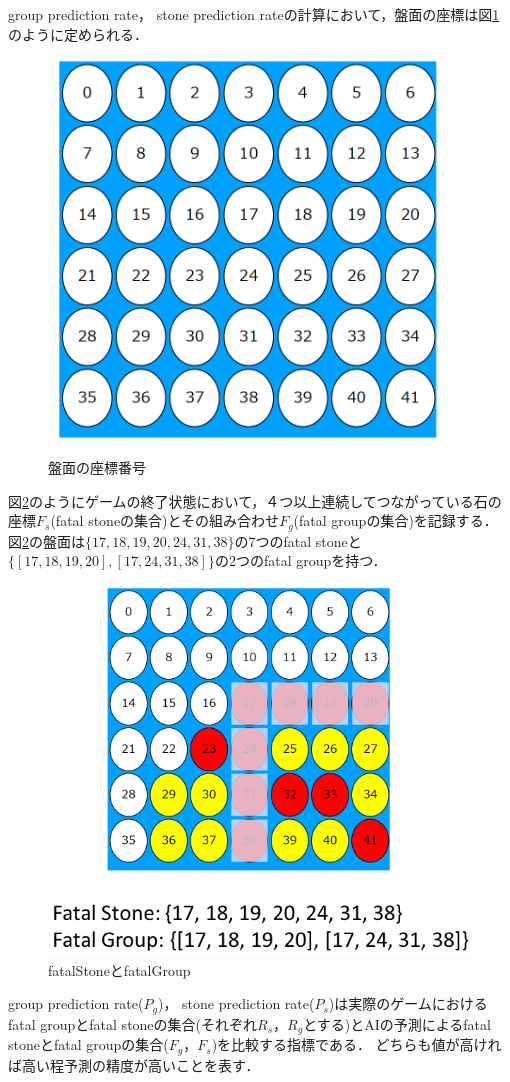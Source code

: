 group prediction rate， stone prediction rateの計算において，盤面の座標は図\ref{fig:index}のように定められる．
\begin{figure}[htbp]
	\centering
	\includegraphics[width=300pt]{./figure/index.png}
	\caption{盤面の座標番号}
	\label{fig:index}
\end{figure}
図\ref{fig:fatalGroup}のようにゲームの終了状態において，４つ以上連続してつながっている石の座標$F_s$(fatal stoneの集合)とその組み合わせ$F_g$(fatal groupの集合)を記録する．
図\ref{fig:fatalGroup}の盤面は$\{17, 18, 19, 20, 24, 31, 38\}$の7つのfatal stoneと$\{[17, 18, 19, 20], [17, 24, 31, 38]\}$の2つのfatal groupを持つ．
\begin{figure}[htbp]
	\centering
	\includegraphics[width=\linewidth]{./figure/fatalGroup.png}
	\caption{fatalStoneとfatalGroup}
	\label{fig:fatalGroup}
\end{figure}
group prediction rate($P_g$)， stone prediction rate($P_s$)は実際のゲームにおけるfatal groupとfatal stoneの集合(それぞれ$R_s， R_g$とする)とAIの予測によるfatal stoneとfatal groupの集合($F_g， F_s$)を比較する指標である．
どちらも値が高ければ高い程予測の精度が高いことを表す．


